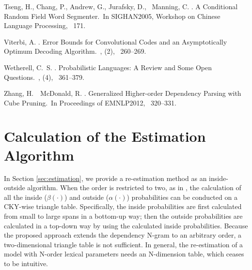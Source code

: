 \documentclass[english]{jnlp_1.4}
\begin{document}
\begin{thebibliography}{}
Tseng, H., Chang, P., Andrew, G., Jurafsky, D., \BBA\ Manning, C. \BBCP.
\newblock \BBOQ A Conditional Random Field Word Segmenter.\BBCQ\
\newblock In {\Bem SIGHAN2005, Workshop on Chinese Language Processing},
  \lowercase{\BVOL}\ 171.

Viterbi, A. \BBOP 1967\BBCP.
\newblock \BBOQ Error Bounds for Convolutional Codes and an Asymptotically
  Optimum Decoding Algorithm.\BBCQ\
,
  {\Bbf 13}  (2), \mbox{\BPGS\ 260--269}.

Wetherell, C.~S. \BBCP.
\newblock \BBOQ Probabilistic Languages: A Review and Some Open
  Questions.\BBCQ\
, {}  (4), \mbox{\BPGS\
  361--379}.

Zhang, H.\BBACOMMA\ \BBA\ McDonald, R. \BBOP 2012\BBCP.
\newblock \BBOQ Generalized Higher-order Dependency Parsing with Cube
  Pruning.\BBCQ\
\newblock In {\Bem Proceedings of EMNLP2012}, \mbox{\BPGS\ 320--331}.

\end{thebibliography}


\appendix

\section{Calculation of the Estimation Algorithm}

In Section \ref{sec:estimation}, we provide a re-estimation method as an inside-outside algorithm. When the order is restricted to two, as in \cite{lee1997}, the calculation of all the inside ($\beta (\cdot)$) and outside ($\alpha (\cdot)$) probabilities can be conducted on a CKY-wise triangle table. Specifically, the inside probabilities are first calculated from small to large spans in a bottom-up way; then the outside probabilities are calculated in a top-down way by using the calculated inside probabilities. Because the proposed approach extends the dependency N-gram to an arbitrary order, a two-dimensional triangle table is not sufficient. In general, the re-estimation of a model with N-order lexical parameters needs an N-dimension table, which ceases to be intuitive.
\end{document}
